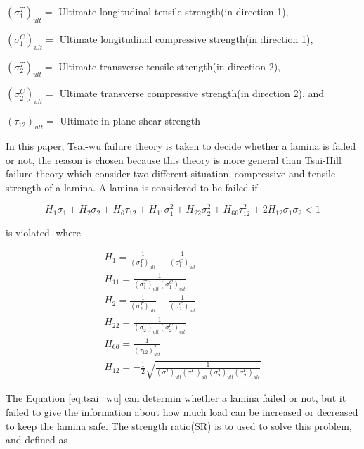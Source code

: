 \documentclass[smallextended]{svjour3}       %
\begin{document}
\vspace{3mm}

$(\sigma_1^T)_{ult}=$ Ultimate longitudinal tensile strength(in direction 1),

$(\sigma_1^C)_{ult}=$ Ultimate longitudinal compressive strength(in direction 1),

$(\sigma_2^T)_{ult}=$ Ultimate transverse tensile strength(in direction 2),

$(\sigma_2^C)_{ult}=$ Ultimate transverse compressive strength(in direction 2), and

$(\tau_{12})_{ult}=$ Ultimate in-plane shear strength

\vspace{3mm}

In this paper, Tsai-wu failure theory is taken to decide whether a lamina is failed or not, the
reason is chosen because this theory is  more general than Tsai-Hill failure theory which consider
two different situation, compressive and tensile strength of a lamina. A lamina is considered to be
failed if


\begin{equation} \label{eq:tsai_wu}
H_1 \sigma_1 + H_2 \sigma_2 + H_6 \tau_{12} + H_{11}\sigma_1^2 + H_{22} \sigma_2^2 + H_{66}
\tau_{12}^2 + 2H_{12}\sigma_1\sigma_2 < 1
\end{equation}
 
is violated. where


\begin{equation}
	\begin{array}{l}
		H_{1}=\frac{1}{\left(\sigma_{1}^{T}\right)_{u l t}}-\frac{1}{\left(\sigma_{1}^{C}\right)_{u l
	t}} \\
	H_{11}=\frac{1}{\left(\sigma_{1}^{T}\right)_{u l t}\left(\sigma_{1}^{C}\right)_{u l t}} \\
	H_{2}=\frac{1}{\left(\sigma_{2}^{T}\right)_{u l t}}-\frac{1}{\left(\sigma_{2}^{C}\right)_{u l
	t}} \\
	H_{22}=\frac{1}{\left(\sigma_{2}^{T}\right)_{u l t}\left(\sigma_{2}^{C}\right)_{u l t}} \\
	H_{66}=\frac{1}{\left(\tau_{12}\right)_{u l t}^{2}} \\
	H_{12}=-\frac{1}{2} \sqrt{\frac{1}{\left(\sigma_{1}^{T}\right)_{u l
				t}\left(\sigma_{1}^{C}\right)_{u l t}\left(\sigma_{2}^{T}\right)_{u l
	t}\left(\sigma_{2}^{C}\right)_{u l t}}}
	\end{array}
\end{equation}


The Equation \ref{eq:tsai_wu} can determin whether a lamina failed or not, but it failed to give the
information about how much load can be increased or decreased to keep the lamina safe. The strength
ratio(SR) is to used to solve this problem, and defined as
\end{document}
